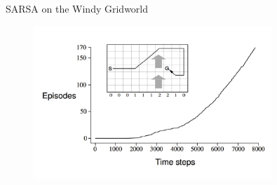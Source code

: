 \bgroup
\begin{frame}{SARSA on the Windy Gridworld}
\begin{figure}
\centering
\hspace{-1cm}\includegraphics[width=0.8\textwidth]{img/sarsa_windy_gridworld.pdf}
\end{figure}
\end{frame}
\egroup